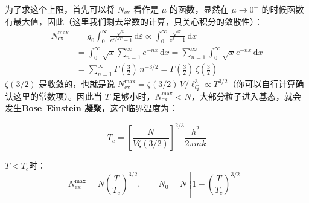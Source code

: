 为了求这个上限，首先可以将 $N_\mathrm{ex}$ 看作是 $\mu$ 的函数，显然在 $\mu \to 0^-$ 的时候函数有最大值，因此（这里我们剩去常数的计算，只关心积分的敛散性）：
\begin{equation}
    \begin{split}
        N_\mathrm{ex}^{\max} &=g_0\int_0^\infty \frac{\sqrt{\varepsilon}}{e^{\varepsilon/kT}-1}\,\mathrm{d}\varepsilon 
        \propto \int_0^\infty \frac{\sqrt{x}}{e^x-1}\,\mathrm{d}x\\
        &=\int_0^\infty \sqrt{x} \sum_{n=1}^\infty e^{-nx}\,\mathrm{d}x=\sum_{n=1}^\infty \int_0^\infty \sqrt{x}e^{-nx}\,\mathrm{d}x\\
        &=\sum_{n=1}^\infty \Gamma(\frac{3}{2})\,n^{-3/2} = \Gamma(\frac{3}{2})\,\zeta(\frac{3}{2})
    \end{split}
\end{equation}
$\zeta(3/2)$ 是收敛的，也就是说 $N_\mathrm{ex}^{\max} = \zeta(3/2)\,V/\ell_Q^3 \propto T^{3/2}$（你可以自行计算确认这里的常数项）。因此当 $T$ 足够小时，$N_\mathrm{ex}^{\max}<N$，大部分粒子进入基态，就会发生\textbf{Bose--Einstein 凝聚}，这个临界温度为：
\begin{corollary}
    \begin{equation}
        T_c = \left[\frac{N}{V\zeta(3/2)}\right]^{2/3}\frac{h^2}{2\pi mk}
    \end{equation}
\end{corollary}
$T<T_c$时：
\begin{equation}
    N_\mathrm{ex}^{\max} = N \left(\frac{T}{T_c}\right)^{3/2},\qquad N_0 = N \left[1-\left(\frac{T}{T_c}\right)^{3/2}\right]
\end{equation}